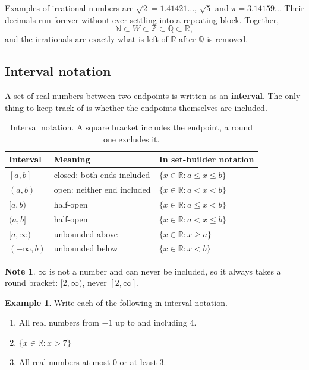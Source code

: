 \documentclass[11pt,a4paper]{article}
\theoremstyle{definition}
\newtheorem{example}[thm]{Example}
\newtheorem{note}[thm]{Note}
\begin{document}
Examples of irrational numbers are $\sqrt{2}=1.41421\ldots$, $\sqrt{5}$ and
$\pi=3.14159\ldots$ Their decimals run forever without ever settling into a repeating
block. Together,
$$\mathbb{N}\subset W\subset\mathbb{Z}\subset\mathbb{Q}\subset\mathbb{R},$$
and the irrationals are exactly what is left of $\mathbb{R}$ after $\mathbb{Q}$ is
removed.

\subsection{Interval notation}

A set of real numbers between two endpoints is written as an \textbf{interval}. The
only thing to keep track of is whether the endpoints themselves are included.

\begin{table}[H]
\centering
\begin{tabular}{|l|l|l|}
\hline
Interval & Meaning & In set-builder notation\\
\hline
$[a,b]$ & closed: both ends included & $\{x\in\mathbb{R} : a\leq x\leq b\}$\\
$(a,b)$ & open: neither end included & $\{x\in\mathbb{R} : a< x< b\}$\\
$[a,b)$ & half-open & $\{x\in\mathbb{R} : a\leq x< b\}$\\
$(a,b]$ & half-open & $\{x\in\mathbb{R} : a< x\leq b\}$\\
$[a,\infty)$ & unbounded above & $\{x\in\mathbb{R} : x\geq a\}$\\
$(-\infty,b)$ & unbounded below & $\{x\in\mathbb{R} : x< b\}$\\
\hline
\end{tabular}
\caption{Interval notation. A square bracket includes the endpoint, a round one excludes it.}
\end{table}

\begin{note}
$\infty$ is not a number and can never be included, so it always takes a round
bracket: $[2,\infty)$, never $[2,\infty]$.
\end{note}

\begin{example}
Write each of the following in interval notation.
\begin{enumerate}
\item[(a).] All real numbers from $-1$ up to and including $4$.
\item[(b).] $\{x\in\mathbb{R} : x>7\}$
\item[(c).] All real numbers at most $0$ or at least $3$.
\end{enumerate}
\end{example}
\end{document}
